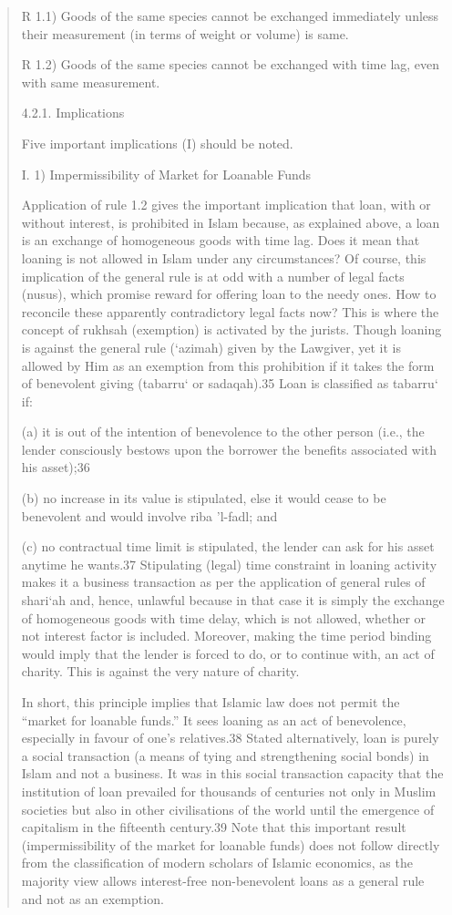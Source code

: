 \begin{quote}
R 1.1) Goods of the same species cannot be exchanged immediately unless their measurement (in terms of weight or volume) is same.

R 1.2) Goods of the same species cannot be exchanged with time lag, even with same measurement.

4.2.1. Implications

Five important implications (I) should be noted.

I. 1) Impermissibility of Market for Loanable Funds

Application of rule 1.2 gives the important implication that loan, with or without interest, is prohibited in Islam because, as explained above, a loan is an exchange of homogeneous goods with time lag. Does it mean that loaning is not allowed in Islam under any circumstances? Of course, this implication of the general rule is at odd with a number of legal facts (nusus), which promise reward for offering loan to the needy ones. How to reconcile these apparently contradictory legal facts now? This is where the concept of rukhsah (exemption) is activated by the jurists. Though loaning is against the general rule (‘azimah) given by the Lawgiver, yet it is allowed by Him as an exemption from this prohibition if it takes the form of benevolent giving (tabarru‘ or sadaqah).35 Loan is classified as tabarru‘ if:

(a) it is out of the intention of benevolence to the other person (i.e., the lender consciously bestows upon the borrower the benefits associated with his asset);36

(b) no increase in its value is stipulated, else it would cease to be benevolent and would involve riba 'l-fadl; and

(c) no contractual time limit is stipulated, the lender can ask for his asset anytime he wants.37 Stipulating (legal) time constraint in loaning activity makes it a business transaction as per the application of general rules of shari‘ah and, hence, unlawful because in that case it is simply the exchange of homogeneous goods with time delay, which is not allowed, whether or not interest factor is included. Moreover, making the time period binding would imply that the lender is forced to do, or to continue with, an act of charity. This is against the very nature of charity.

In short, this principle implies that Islamic law does not permit the “market for loanable funds.” It sees loaning as an act of benevolence, especially in favour of one's relatives.38 Stated alternatively, loan is purely a social transaction (a means of tying and strengthening social bonds) in Islam and not a business. It was in this social transaction capacity that the institution of loan prevailed for thousands of centuries not only in Muslim societies but also in other civilisations of the world until the emergence of capitalism in the fifteenth century.39 Note that this important result (impermissibility of the market for loanable funds) does not follow directly from the classification of modern scholars of Islamic economics, as the majority view allows interest-free non-benevolent loans as a general rule and not as an exemption.


\end{quote}

